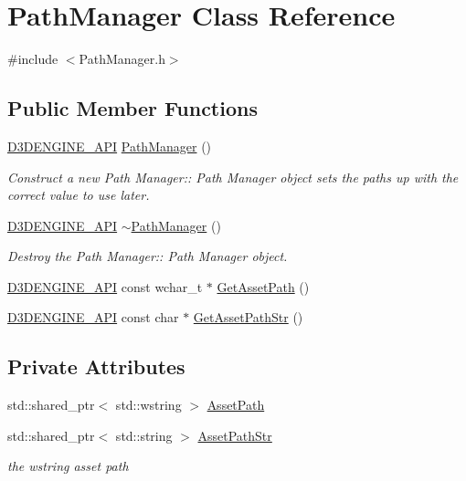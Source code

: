 \hypertarget{class_path_manager}{}\section{Path\+Manager Class Reference}
\label{class_path_manager}


{\ttfamily \#include $<$Path\+Manager.\+h$>$}

\subsection*{Public Member Functions}
\begin{DoxyCompactItemize}
\item 
\mbox{\hyperlink{stdafx_8h_a8ee2d990c5dfba7794dd2b60741d7722}{D3\+D\+E\+N\+G\+I\+N\+E\+\_\+\+A\+PI}} \mbox{\hyperlink{class_path_manager_a9d91d6b3fcb797f77e7eace2bbf798bd}{Path\+Manager}} ()
\begin{DoxyCompactList}\small\item\em Construct a new Path Manager\+:\+: Path Manager object sets the paths up with the correct value to use later. \end{DoxyCompactList}\item 
\mbox{\hyperlink{stdafx_8h_a8ee2d990c5dfba7794dd2b60741d7722}{D3\+D\+E\+N\+G\+I\+N\+E\+\_\+\+A\+PI}} \mbox{\hyperlink{class_path_manager_ac666917e7caaa1e4a56e5eab764b3ec7}{$\sim$\+Path\+Manager}} ()
\begin{DoxyCompactList}\small\item\em Destroy the Path Manager\+:\+: Path Manager object. \end{DoxyCompactList}\item 
\mbox{\hyperlink{stdafx_8h_a8ee2d990c5dfba7794dd2b60741d7722}{D3\+D\+E\+N\+G\+I\+N\+E\+\_\+\+A\+PI}} const wchar\+\_\+t $\ast$ \mbox{\hyperlink{class_path_manager_a959fe4866fb2388dd46eaf872a1a15ce}{Get\+Asset\+Path}} ()
\item 
\mbox{\hyperlink{stdafx_8h_a8ee2d990c5dfba7794dd2b60741d7722}{D3\+D\+E\+N\+G\+I\+N\+E\+\_\+\+A\+PI}} const char $\ast$ \mbox{\hyperlink{class_path_manager_aa66f8bb5f729328242e7386babc1ff22}{Get\+Asset\+Path\+Str}} ()
\end{DoxyCompactItemize}
\subsection*{Private Attributes}
\begin{DoxyCompactItemize}
\item 
std\+::shared\+\_\+ptr$<$ std\+::wstring $>$ \mbox{\hyperlink{class_path_manager_aa10cc8c03331c77828bf9e155644d018}{Asset\+Path}}
\item 
std\+::shared\+\_\+ptr$<$ std\+::string $>$ \mbox{\hyperlink{class_path_manager_ad037448c8b23e1c60c89ad7d3e188d3a}{Asset\+Path\+Str}}
\begin{DoxyCompactList}\small\item\em the wstring asset path \end{DoxyCompactList}\end{DoxyCompactItemize}


